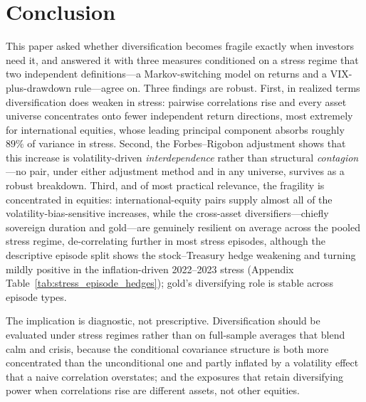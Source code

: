 
\section{Conclusion}
\label{sec:conclusion}

This paper asked whether diversification becomes fragile exactly when investors need it, and answered it with three measures conditioned on a stress regime that two independent definitions---a Markov-switching model on returns and a VIX-plus-drawdown rule---agree on. Three findings are robust. First, in realized terms diversification does weaken in stress: pairwise correlations rise and every asset universe concentrates onto fewer independent return directions, most extremely for international equities, whose leading principal component absorbs roughly $89\%$ of variance in stress. Second, the Forbes--Rigobon adjustment shows that this increase is volatility-driven \emph{interdependence} rather than structural \emph{contagion}---no pair, under either adjustment method and in any universe, survives as a robust breakdown. Third, and of most practical relevance, the fragility is concentrated in equities: international-equity pairs supply almost all of the volatility-bias-sensitive increases, while the cross-asset diversifiers---chiefly sovereign duration and gold---are genuinely resilient on average across the pooled stress regime, de-correlating further in most stress episodes, although the descriptive episode split shows the stock--Treasury hedge weakening and turning mildly positive in the inflation-driven 2022--2023 stress (Appendix Table~\ref{tab:stress_episode_hedges}); gold's diversifying role is stable across episode types.

The implication is diagnostic, not prescriptive. Diversification should be evaluated under stress regimes rather than on full-sample averages that blend calm and crisis, because the conditional covariance structure is both more concentrated than the unconditional one and partly inflated by a volatility effect that a naive correlation overstates; and the exposures that retain diversifying power when correlations rise are different assets, not other equities.

